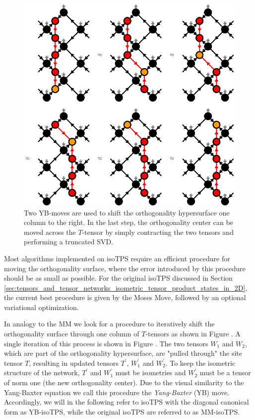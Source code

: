 \begin{figure}
	\centering
	\includegraphics[scale=1]{figures/tikz/YB_isoTPS/shifting_ortho_surface/shifting_ortho_surface.pdf}
	\caption{Two YB-moves are used to shift the orthogonality hypersurface one column to the right. In the last step, the orthogonality center can be moved across the $T$-tensor by simply contracting the two tensors and performing a truncated SVD.}
	\label{fig:YB_isoTPS_moving_ortho_surface}
\end{figure}
Most algorithms implemented on isoTPS require an efficient procedure for moving the orthogonality surface, where the error introduced by this procedure should be as small as possible. For the original isoTPS discussed in Section \ref{sec:tensors_and_tensor_networks_isometric_tensor_product_states_in_2D}, the current best procedure is given by the Moses Move, followed by an optional variational optimization. \par
In analogy to the MM we look for a procedure to iteratively shift the orthogonality surface through one column of $T$-tensors as shown in Figure . A single iteration of this process is shown in Figure . The two tensors $W_1$ and $W_2$, which are part of the orthogonality hypersurface, are "pulled through" the site tensor $T$, resulting in updated tensors $T^\prime$, $W_1^\prime$ and $W_2^\prime$. To keep the isometric structure of the network, $T^\prime$ and $W_1^\prime$ must be isometries and $W_2^\prime$ must be a tensor of norm one (the new orthogonality center). Due to the visual similarity to the Yang-Baxter equation we call this procedure the \textit{Yang-Baxter} (YB) move. Accordingly, we will in the following refer to isoTPS with the diagonal canonical form as YB-isoTPS, while the original isoTPS are referred to as MM-isoTPS. \par
